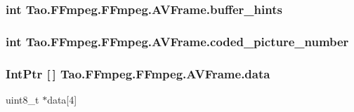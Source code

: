\hypertarget{struct_tao_1_1_f_fmpeg_1_1_f_fmpeg_1_1_a_v_frame_afcc4c4e26211e53450c885f083345f4f}{
\subsubsection[{buffer\_\-hints}]{\setlength{\rightskip}{0pt plus 5cm}int {\bf Tao.FFmpeg.FFmpeg.AVFrame.buffer\_\-hints}}}
\label{struct_tao_1_1_f_fmpeg_1_1_f_fmpeg_1_1_a_v_frame_afcc4c4e26211e53450c885f083345f4f}
\hypertarget{struct_tao_1_1_f_fmpeg_1_1_f_fmpeg_1_1_a_v_frame_af197a9d230da7ed828265558b6abc063}{
\subsubsection[{coded\_\-picture\_\-number}]{\setlength{\rightskip}{0pt plus 5cm}int {\bf Tao.FFmpeg.FFmpeg.AVFrame.coded\_\-picture\_\-number}}}
\label{struct_tao_1_1_f_fmpeg_1_1_f_fmpeg_1_1_a_v_frame_af197a9d230da7ed828265558b6abc063}
\hypertarget{struct_tao_1_1_f_fmpeg_1_1_f_fmpeg_1_1_a_v_frame_abbc10f506e044b7b2ecd06c4759bc18c}{
\subsubsection[{data}]{\setlength{\rightskip}{0pt plus 5cm}IntPtr \mbox{[}$\,$\mbox{]} {\bf Tao.FFmpeg.FFmpeg.AVFrame.data}}}
\label{struct_tao_1_1_f_fmpeg_1_1_f_fmpeg_1_1_a_v_frame_abbc10f506e044b7b2ecd06c4759bc18c}


uint8\_\-t $\ast$data\mbox{[}4\mbox{]} 

